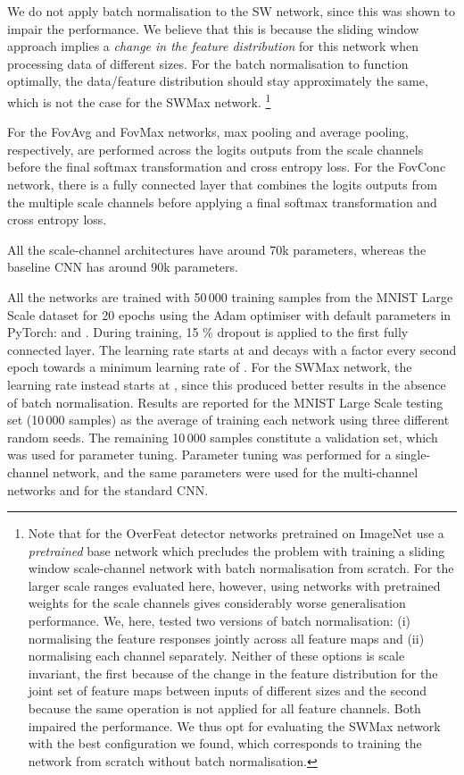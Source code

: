 \documentclass[twocolumn,runningheads]{svjour3}
\begin{document}
We do not apply batch normalisation to the SW network, since this was shown to impair the performance. We believe that this is because the
  sliding window approach implies a \emph{change in the feature
  distribution} for this network when processing data of different sizes. 
  For the batch normalisation to function optimally, the data/feature 
  distribution should stay approximately the same, which is not the case for the SWMax network. 
        \footnote{Note that for the OverFeat detector \cite{SerEigZhaMatFerLeC13-arXiv} networks pretrained on ImageNet use a \emph{pretrained} base network which precludes the problem with training a sliding window scale-channel network with batch normalisation from scratch. For the larger scale ranges evaluated here, however, using networks with pretrained weights for the scale channels gives considerably worse generalisation performance.  We, here, tested two versions of batch normalisation: (i) normalising the feature responses jointly across all feature maps and (ii) normalising each channel separately. Neither of these options is scale invariant, the first because of the change in the feature distribution for the joint set of feature maps between inputs of different sizes and the second because the same operation is not applied for all feature channels. Both impaired the performance. We thus opt for evaluating the SWMax network with the best configuration we found, which corresponds to training the network from scratch without batch normalisation.}

For the FovAvg and FovMax networks, max pooling and average pooling, respectively, are performed across the logits outputs from the scale channels before the final softmax transformation and cross entropy loss. For the FovConc network, there is a fully connected layer that combines the logits outputs from the multiple scale channels before applying a final softmax transformation and cross entropy loss.

 All the scale-channel
architectures have around 70k parameters, whereas the baseline CNN
has around 90k parameters.

All the networks are trained with 50\,000 training samples from the
MNIST Large Scale dataset for 20 epochs using the Adam optimiser
with default parameters in PyTorch:  and .
During training, 15 \% dropout is applied to the first fully connected
layer. The learning rate starts at  and decays with a factor
 every second epoch towards a minimum learning rate of
. For the SWMax network, the learning rate instead starts at , since this produced better results in the absence of batch normalisation. Results are reported for the MNIST Large Scale testing set
(10\,000 samples) as the average of training each network using three
different random seeds. The remaining 10\,000 samples constitute a
validation set, which was used for parameter tuning. Parameter tuning was performed for a single-channel network, and the same parameters were used for the multi-channel networks and for the standard CNN.
\end{document}
